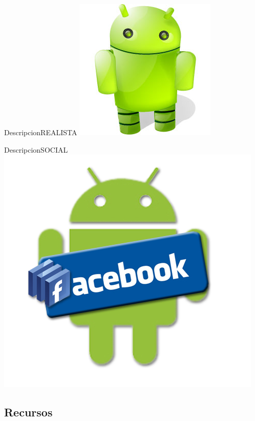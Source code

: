 \documentclass{beamer}
\begin{document}
\begin{frame}{Descripcion}{REALISTA}
   \includegraphics[scale=0.5]{droid.jpg}
\end{frame}

\begin{frame}{Descripcion}{SOCIAL}
   \includegraphics[scale=0.5]{fb.jpg}
\end{frame}




\subsection{Recursos}
\end{document}
